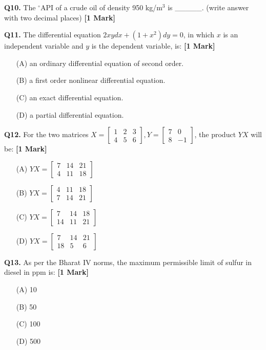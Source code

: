 \documentclass[11pt]{article}
\newcommand{\questiona}[2]{
    \noindent\textbf{Q#2.} #1 \hfill \textbf{[1 Mark]}
}
\begin{document}
\questiona{The \(^\circ\)API of a crude oil of density 950 kg/m\(^3\) is \_\_\_\_\_. (write answer with two decimal places)}{10}
\vspace{0.5cm}

\questiona{The differential equation \(2xy dx + (1 + x^2) dy = 0\), in which \(x\) is an independent variable and \(y\) is the dependent variable, is:}{11}
\begin{enumerate}
    \item[(A)] an ordinary differential equation of second order.  
    \item[(B)] a first order nonlinear differential equation.  
    \item[(C)] an exact differential equation.  
    \item[(D)] a partial differential equation.  
\end{enumerate}
\vspace{0.5cm}

\questiona{For the two matrices \( X = \begin{bmatrix} 1 & 2 & 3 \\ 4 & 5 & 6 \end{bmatrix}, Y = \begin{bmatrix} 7 & 0 \\ 8 & -1 \end{bmatrix} \), the product \( YX \) will be:}{12}
\begin{enumerate}
    \item[(A)] \( YX = \begin{bmatrix} 7 & 14 & 21 \\ 4 & 11 & 18 \end{bmatrix} \)  
    \item[(B)] \( YX = \begin{bmatrix} 4 & 11 & 18 \\ 7 & 14 & 21 \end{bmatrix} \)  
    \item[(C)] \( YX = \begin{bmatrix} 7 & 14 & 18 \\ 14 & 11 & 21 \end{bmatrix} \)  
    \item[(D)] \( YX = \begin{bmatrix} 7 & 14 & 21 \\ 18 & 5 & 6 \end{bmatrix} \)  
\end{enumerate}
\vspace{0.5cm}

\questiona{As per the Bharat IV norms, the maximum permissible limit of sulfur in diesel in ppm is:}{13}
\begin{enumerate}
    \item[(A)] 10  
    \item[(B)] 50  
    \item[(C)] 100  
    \item[(D)] 500  
\end{enumerate}
\vspace{0.5cm}
\end{document}
